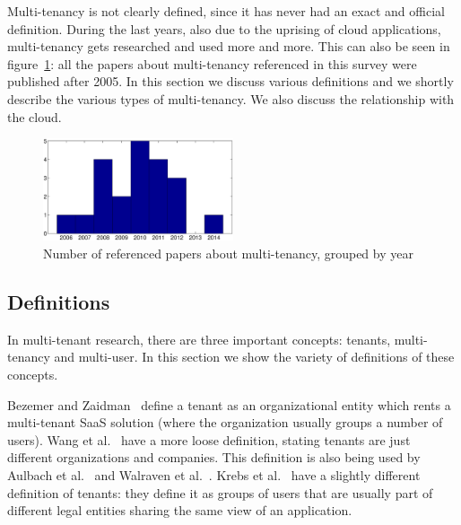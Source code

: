 Multi-tenancy is not clearly defined, since it has never had an exact and official definition. During the last years, also due to the uprising of cloud applications, multi-tenancy gets researched and used more and more. This can also be seen in figure~\ref{fig:papercount}: all the papers about multi-tenancy referenced in this survey were published after 2005. In this section we discuss various definitions and we shortly describe the various types of multi-tenancy. We also discuss the relationship with the cloud.

\begin{figure}[H]
	\centering
		\includegraphics[width=0.5\textwidth]{assets/papers.eps}
		\caption{Number of referenced papers about multi-tenancy, grouped by year}
		\label{fig:papercount}
\end{figure}

\subsection{Definitions}

In multi-tenant research, there are three important concepts: tenants, multi-tenancy and multi-user. In this section we show the variety of definitions of these concepts.

Bezemer and Zaidman~\cite{bezemer2010multi} define a tenant as an organizational entity which rents a multi-tenant \ac{SaaS} solution (where the organization usually groups a number of users). Wang et al.~\cite{wang2008study} have a more loose definition, stating tenants are just different organizations and companies. This definition is also being used by Aulbach et al.~\cite{aulbach2008multi} and Walraven et al.~\cite{walraven2012towards}. Krebs et al.~\cite{krebs2012architecture} have a slightly different definition of tenants: they define it as groups of users that are usually part of different legal entities sharing the same view of an application.

